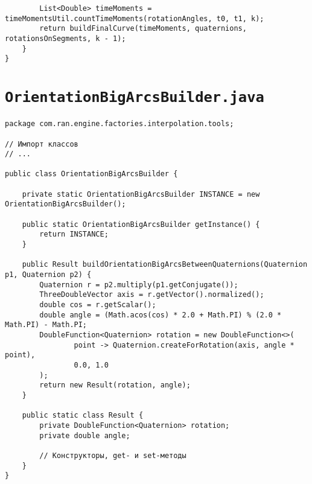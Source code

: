 \begin{verbatim}
        List<Double> timeMoments = timeMomentsUtil.countTimeMoments(rotationAngles, t0, t1, k);
        return buildFinalCurve(timeMoments, quaternions, rotationsOnSegments, k - 1);
    }
}
\end{verbatim}

\section*{\texttt{OrientationBigArcsBuilder.java}}
\begin{verbatim}
package com.ran.engine.factories.interpolation.tools;

// Импорт классов
// ...

public class OrientationBigArcsBuilder {

    private static OrientationBigArcsBuilder INSTANCE = new OrientationBigArcsBuilder();

    public static OrientationBigArcsBuilder getInstance() {
        return INSTANCE;
    }

    public Result buildOrientationBigArcsBetweenQuaternions(Quaternion p1, Quaternion p2) {
        Quaternion r = p2.multiply(p1.getConjugate());
        ThreeDoubleVector axis = r.getVector().normalized();
        double cos = r.getScalar();
        double angle = (Math.acos(cos) * 2.0 + Math.PI) % (2.0 * Math.PI) - Math.PI;
        DoubleFunction<Quaternion> rotation = new DoubleFunction<>(
                point -> Quaternion.createForRotation(axis, angle * point),
                0.0, 1.0
        );
        return new Result(rotation, angle);
    }

    public static class Result {
        private DoubleFunction<Quaternion> rotation;
        private double angle;

        // Конструкторы, get- и set-методы
    }
}
\end{verbatim}

